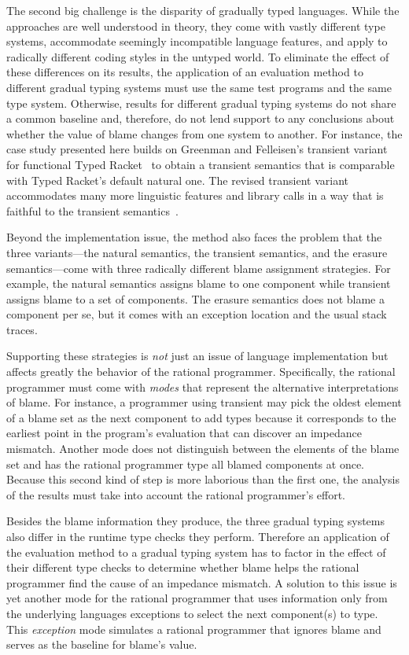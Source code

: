 The second big challenge is the disparity of gradually
typed languages. While the approaches are well understood in theory,
they come with vastly different type systems, accommodate seemingly
incompatible language features, and apply to radically different coding
styles in the untyped world.  To eliminate the effect of these differences 
on its results, the application of an evaluation method to different
gradual typing systems must use the same test programs and the same type
system. Otherwise, results for different gradual typing systems 
do not share a common baseline and, therefore, do not lend support to any
conclusions about whether the value of blame changes from one system to
another. For instance, the case study presented here builds on
Greenman and Felleisen's transient variant for functional Typed
Racket~\cite{gf-icfp-2018} to obtain a transient semantics that is
comparable with Typed Racket's default natural one. The revised transient
variant accommodates many more linguistic features and library calls
in a way that is faithful to the transient
semantics~\cite{vss-popl-2017}.

Beyond the implementation issue, the method also faces the problem that
the three variants---the natural semantics, the transient semantics, and
the erasure semantics---come with three radically different blame
assignment strategies.  For example, the natural semantics assigns blame
to one component while transient assigns blame to a set of components. The
erasure semantics does not blame a component per se, but it comes with an
exception location and the usual stack traces. 

Supporting these strategies is {\em not\/} just an issue of language
implementation but affects greatly the behavior of the rational programmer.
Specifically, the rational programmer must come with \emph{modes}
that represent the alternative interpretations of blame. 
For instance, a programmer using transient may
pick the oldest element of a blame set as the next component to add types because
it corresponds to the earliest point in the program's evaluation that can
discover an impedance mismatch.  Another mode does not distinguish between the elements of the
blame set and has the rational programmer type all blamed components
at once. Because this second kind of step 
is more laborious than the first one, the analysis of the results must take 
into account the rational programmer's effort.

Besides the blame information they produce, the three gradual typing
systems also differ in the runtime type checks they perform. Therefore an
application of the evaluation method to a gradual typing system has to
factor in the effect of their different type checks to determine whether blame helps the
rational programmer find the cause of an impedance mismatch. A solution to this issue
is yet another mode for the rational programmer that uses information only
from the underlying languages exceptions to select the next component(s) to type.
This \emph{exception} mode simulates a rational programmer that ignores
blame and serves as the baseline for blame's value.


